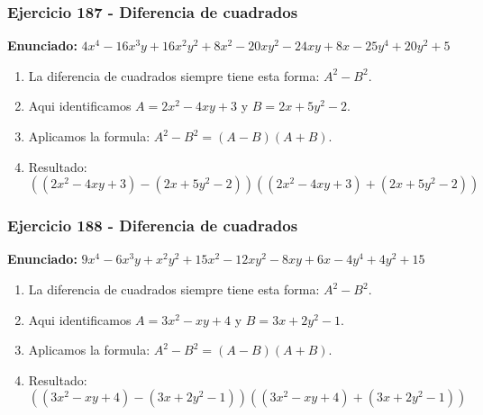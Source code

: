 \documentclass[11pt,a4paper]{article}
\begin{document}
\vspace{0.2cm}
\subsubsection*{Ejercicio 187 - Diferencia de cuadrados}
\textbf{Enunciado:} $ 4 x^{4} - 16 x^{3} y + 16 x^{2} y^{2} + 8 x^{2} - 20 x y^{2} - 24 x y + 8 x - 25 y^{4} + 20 y^{2} + 5 $\par
\begin{enumerate}[leftmargin=2em]
\item La diferencia de cuadrados siempre tiene esta forma: \(A^2-B^2\).
\item Aqui identificamos \(A=2 x^{2} - 4 x y + 3\) y \(B=2 x + 5 y^{2} - 2\).
\item Aplicamos la formula: \(A^2-B^2=(A-B)(A+B)\).
\item Resultado: \[\boxed{\left(\left(2 x^{2} - 4 x y + 3\right)-\left(2 x + 5 y^{2} - 2\right)\right)\left(\left(2 x^{2} - 4 x y + 3\right)+\left(2 x + 5 y^{2} - 2\right)\right)}\]
\end{enumerate}

\vspace{0.2cm}
\subsubsection*{Ejercicio 188 - Diferencia de cuadrados}
\textbf{Enunciado:} $ 9 x^{4} - 6 x^{3} y + x^{2} y^{2} + 15 x^{2} - 12 x y^{2} - 8 x y + 6 x - 4 y^{4} + 4 y^{2} + 15 $\par
\begin{enumerate}[leftmargin=2em]
\item La diferencia de cuadrados siempre tiene esta forma: \(A^2-B^2\).
\item Aqui identificamos \(A=3 x^{2} - x y + 4\) y \(B=3 x + 2 y^{2} - 1\).
\item Aplicamos la formula: \(A^2-B^2=(A-B)(A+B)\).
\item Resultado: \[\boxed{\left(\left(3 x^{2} - x y + 4\right)-\left(3 x + 2 y^{2} - 1\right)\right)\left(\left(3 x^{2} - x y + 4\right)+\left(3 x + 2 y^{2} - 1\right)\right)}\]
\end{enumerate}

\vspace{0.2cm}
\end{document}

